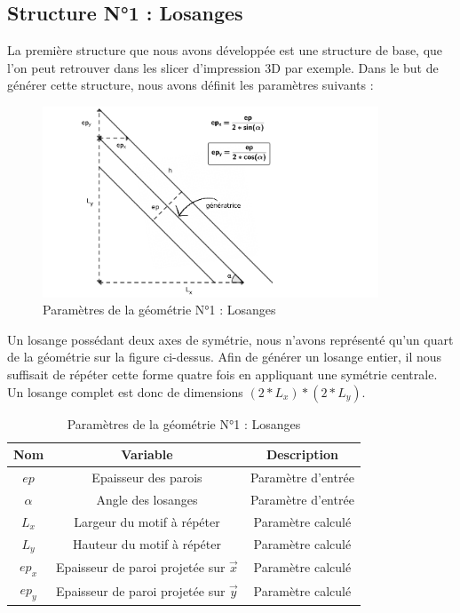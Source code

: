 \documentclass[a4paper]{article}
\begin{document}
	\subsection{Structure N°1 : Losanges}
	\label{losanges}
	\hspace{0.5cm}La première structure que nous avons développée est une structure de base, que l’on peut retrouver dans les slicer d’impression 3D par exemple. Dans le but de générer cette structure, nous avons définit les paramètres suivants :
	
	\begin{figure}[H]
		\centering
		\includegraphics[width=10cm]{Images/5/losanges.pdf}
		\caption{Paramètres de la géométrie N°1 : Losanges}
	\end{figure}
	
	Un losange possédant deux axes de symétrie, nous n’avons représenté qu’un quart de la géométrie sur la figure ci-dessus. Afin de générer un losange entier, il nous suffisait de répéter cette forme quatre fois en appliquant une symétrie centrale. Un losange complet est donc de dimensions $(2* L_x)*(2*L_y).$
	
	\begin{table}[h]
		\centering
		\begin{tabular}{|c|c|c|}
			\hline
			\rowcolor{Gray}
			\textbf{Nom} & \textbf{Variable} & \textbf{Description} \\
			\hline\hline
			$ep$ & Epaisseur des parois & Paramètre d'entrée \\
			$\alpha$ & Angle des losanges & Paramètre d'entrée \\
			$L_x$ & Largeur du motif à répéter & Paramètre calculé \\
			$L_y$ & Hauteur du motif à répéter & Paramètre calculé \\
			$ep_x$ & Epaisseur de paroi projetée sur $\vec{x}$ & Paramètre calculé \\
			$ep_y$ & Epaisseur de paroi projetée sur $\vec{y}$ & Paramètre calculé \\
			\hline
		\end{tabular}
		\caption{Paramètres de la géométrie N°1 : Losanges}
	\end{table}
	
\end{document}
